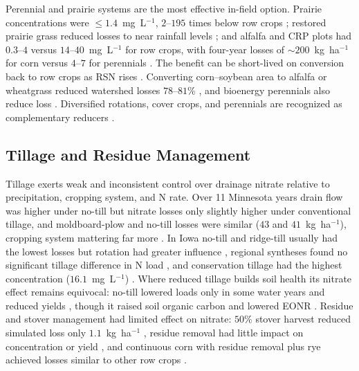 \documentclass[11pt]{article}
\begin{document}
Perennial and prairie systems are the most effective in-field option. Prairie
concentrations were $\le1.4$~mg~L$^{-1}$, $2$--$195$ times below row crops
\parencite{Daigh2015b}; restored prairie grass reduced losses to near rainfall
levels \parencite{HernandezRamirez2011}; and alfalfa and CRP plots had
$0.3$--$4$ versus $14$--$40$~mg~L$^{-1}$ for row crops, with four-year losses
of $\sim200$~kg~ha$^{-1}$ for corn versus $4$--$7$ for perennials
\parencite{Randall2001,Waring2024}. The benefit can be short-lived on
conversion back to row crops as RSN rises \parencite{Huggins2001}. Converting
corn--soybean area to alfalfa or wheatgrass reduced watershed losses
$78$--$81\%$ \parencite{Wilson2023}, and bioenergy perennials also reduce
loss \parencite{Ferin2023,Woodbury2018,Guo2018}. Diversified rotations, cover
crops, and perennials are recognized as complementary reducers
\parencite{Dinnes2002}.

\subsection{Tillage and Residue Management}

Tillage exerts weak and inconsistent control over drainage nitrate relative to
precipitation, cropping system, and N rate. Over 11 Minnesota years drain flow
was higher under no-till but nitrate losses only slightly higher under
conventional tillage, and moldboard-plow and no-till losses were similar
($43$ and $41$~kg~ha$^{-1}$), cropping system mattering far more
\parencite{RANDALL1995,Randall2001}. In Iowa no-till and ridge-till usually
had the lowest losses but rotation had greater influence
\parencite{Weed1996,Kanwar1997}, regional syntheses found no significant
tillage difference in N load \parencite{Zhao2016}, and conservation tillage
had the highest concentration ($16.1$~mg~L$^{-1}$) \parencite{Hertzberger2019,Wang2016b}.
Where reduced tillage builds soil health its nitrate effect remains equivocal:
no-till lowered loads only in some water years and reduced yields
\parencite{Masri2024}, though it raised soil organic carbon and lowered EONR
\parencite{Cassman2025,Waring2024}. Residue and stover management had limited
effect on nitrate: $50\%$ stover harvest reduced simulated loss only
$1.1$~kg~ha$^{-1}$ \parencite{Malone2019}, residue removal had little impact on
concentration or yield \parencite{Dougherty2020,Guo2018}, and continuous corn
with residue removal plus rye achieved losses similar to other row crops
\parencite{Daigh2015b,Farahani2020}.
\end{document}
